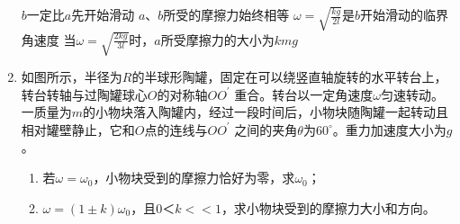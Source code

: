 \begin{enumerate}[leftmargin=0em]
\fourchoices
{$ b $一定比$ a $先开始滑动}
{$ a $、$ b $所受的摩擦力始终相等}
{$\omega = \sqrt { \frac { k g } { 2 l } }$是$ b $开始滑动的临界角速度}
{当$\omega = \sqrt { \frac { 2 k g } { 3 l } }$时，$ a $所受摩擦力的大小为$ kmg $}



\newpage	
\item 
{}
如图所示，半径为$ R $的半球形陶罐，固定在可以绕竖直轴旋转的水平转台上，转台转轴与过陶罐球心$ O $的对称轴$ OO ^{\prime} $ 重合。转台以一定角速度$ \omega $匀速转动。一质量为$ m $的小物块落入陶罐内，经过一段时间后，小物块随陶罐一起转动且相对罐壁静止，它和$ O $点的连线与$ OO ^{\prime} $ 之间的夹角$ \theta $为$ 60 ^{ \circ } $。重力加速度大小为$ g $。
\begin{enumerate}
\renewcommand{\labelenumi}{\arabic{enumi}.}
\item
若$ \omega = \omega _0 $，小物块受到的摩擦力恰好为零，求$ \omega_ 0 $；
\item 
$ \omega =(1 \pm k) \omega_ 0 $，且$ 0 ＜k <<1 $，求小物块受到的摩擦力大小和方向。



\end{enumerate}
\begin{figure}[h!]
\flushright

\end{figure}









\end{enumerate}
